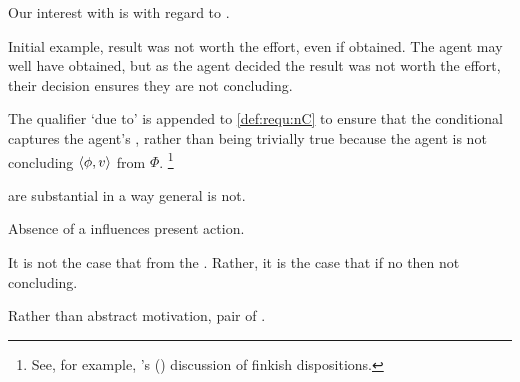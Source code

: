 \begin{note}
  Our interest with  is with regard to .

  Initial example, result was not worth the effort, even if obtained.
  The agent may well have obtained, but as the agent decided the result was not worth the effort, their decision ensures they are not concluding.
\end{note}

\begin{note}
  The qualifier `due to' is appended to \ref{def:requ:nC} to ensure that the conditional captures the agent's \ninf{}, rather than being trivially true because the agent is not concluding \(\langle \phi, v \rangle\) from \(\Phi\).%
  \footnote{
    See, for example, \citeauthor{Lewis:1997wg}'s (\citeyear{Lewis:1997wg}) discussion of finkish dispositions.
  }
\end{note}

\begin{note}
   are substantial in a way general \ninf{} is not.

  Absence of a \fc{} influences present action.

  It is not the case that from the \agpe{}.
  Rather, it is the case that if no \fc{} then not concluding.

  Rather than abstract motivation, pair of .
\end{note}

